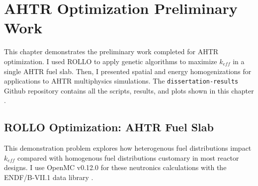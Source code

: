 \chapter{AHTR Optimization Preliminary Work}
\label{chap:rollo-demo}
This chapter demonstrates the preliminary work completed for \gls{AHTR} optimization. 
I used \gls{ROLLO} to apply genetic algorithms to maximize $k_{eff}$ in a single 
\gls{AHTR} fuel slab. 
Then, I presented spatial and energy homogenizations for applications to 
\gls{AHTR} multiphysics simulations.
The \texttt{dissertation-results} Github repository contains all the scripts, 
results, and plots shown in this chapter \cite{chee_dissertation-results_2021}.

\section{ROLLO Optimization: AHTR Fuel Slab}
\label{sec:rollo_opt_ahtr_slab}
This demonstration problem explores how heterogenous fuel distributions impact 
$k_{eff}$ compared with homogenous fuel distributions customary in most reactor 
designs. 
I use OpenMC v0.12.0 for these neutronics calculations with the ENDF/B-VII.1
data library \cite{chadwick_endf/b-vii.1_2011}. 

